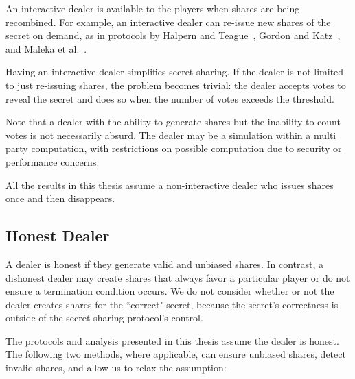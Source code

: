 \documentclass[12pt]{dalcsthesis}
\begin{document}
An interactive dealer is available to the players when shares are being recombined. For example, an interactive dealer can re-issue new shares of the secret on demand, as in protocols by Halpern and Teague~\cite{halpern04}, Gordon and Katz~\cite{gordon06}, and Maleka et al.~\cite{maleka08}.

Having an interactive dealer simplifies secret sharing. If the dealer is not limited to just re-issuing shares, the problem becomes trivial: the dealer accepts votes to reveal the secret and does so when the number of votes exceeds the threshold.

Note that a dealer with the ability to generate shares but the inability to count votes is not necessarily absurd. The dealer may be a simulation within a multi party computation, with restrictions on possible computation due to security or performance concerns.

All the results in this thesis assume a non-interactive dealer who issues shares once and then disappears.

\subsection{Honest Dealer}

A dealer is honest if they generate valid and unbiased shares. In contrast, a dishonest dealer may create shares that always favor a particular player or do not ensure a termination condition occurs. We do not consider whether or not the dealer creates shares for the ``correct" secret, because the secret's correctness is outside of the secret sharing protocol's control.

The protocols and analysis presented in this thesis assume the dealer is honest. The following two methods, where applicable, can ensure unbiased shares, detect invalid shares, and allow us to relax the assumption:
\end{document}
